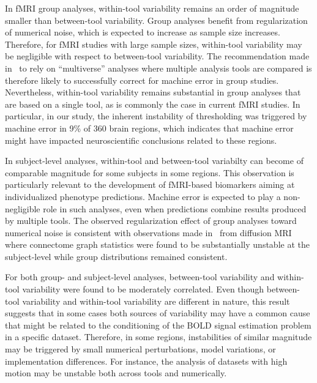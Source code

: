 \documentclass[11pt,onecolumn]{article}
\begin{document}
{In fMRI group analyses, within-tool variability remains an order of magnitude smaller
than between-tool variability. Group analyses benefit from regularization
of numerical noise, which is expected to increase as sample size
increases. Therefore, for fMRI studies with large sample sizes, within-tool variability may be negligible with respect to between-tool variability. The
recommendation made in~\cite{botvinik2020variability} to rely on
``multiverse'' analyses where multiple analysis tools are compared is
therefore likely to successfully correct for machine error in group
studies. Nevertheless, within-tool variability remains substantial in group analyses
that are based on a single tool, as is commonly the case in current fMRI
studies. In particular, in our study, the inherent instability of
thresholding was triggered by machine error in 9\% of 360 brain regions,
which indicates that machine error might have impacted neuroscientific
conclusions related to these regions.

In subject-level analyses, within-tool and between-tool variabilty can become
of comparable magnitude for some subjects in some regions. This observation
is particularly relevant to the development of fMRI-based biomarkers aiming
at individualized phenotype predictions. Machine error is expected to play
a non-negligible role in such analyses, even when predictions combine
results produced by multiple tools. The observed regularization effect of
group analyses toward numerical noise is consistent with observations made
in~\cite{kiar2020numerical} from diffusion MRI where connectome graph
statistics were found to be substantially unstable at the subject-level
while group distributions remained consistent. 

For both group- and subject-level analyses, between-tool variability and within-tool
variability were found to be moderately correlated. Even though between-tool
variability and within-tool  variability are different in nature, this result
suggests that in some cases both sources of variability may have a common
cause that might be related to the conditioning of the BOLD signal
estimation problem  in a specific dataset. Therefore, in some regions,
instabilities of similar magnitude may be triggered by small numerical
perturbations, model variations, or implementation differences. For
instance, the analysis of datasets with high motion may be unstable both
across tools and numerically.

}
\end{document}
